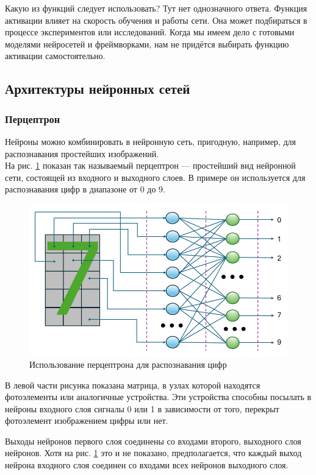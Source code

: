 Какую из функций следует использовать? Тут нет однозначного ответа. Функция активации влияет на скорость обучения и работы сети. Она может подбираться в процессе экспериментов или исследований. Когда мы имеем дело с готовыми моделями нейросетей и фреймворками, нам не придётся выбирать функцию активации самостоятельно.

\subsection{Архитектуры нейронных сетей}

\subsubsection*{Перцептрон}
Нейроны можно комбинировать в нейронную сеть, пригодную, например, для распознавания простейших изображений.\\

На рис. \ref{perceptron} показан так называемый перцептрон — простейший вид нейронной сети, состоящей из входного и выходного слоев. В примере он используется для распознавания цифр в диапазоне от 0 до 9.

\begin{figure}[H]
    \centering
    \includegraphics[width = 12cm]{perceptron.jpg}
    \caption{Использование перцептрона для распознавания цифр}
    \label{perceptron}
\end{figure}

В левой части рисунка показана матрица, в узлах которой находятся фотоэлементы или аналогичные устройства. Эти устройства способны посылать в нейроны входного слоя сигналы 0 или 1 в зависимости от того, перекрыт фотоэлемент изображением цифры или нет.

Выходы нейронов первого слоя соединены со входами второго, выходного слоя нейронов. Хотя на рис. \ref{perceptron} это и не показано, предполагается, что каждый выход нейрона входного слоя соединен со входами всех нейронов выходного слоя.

